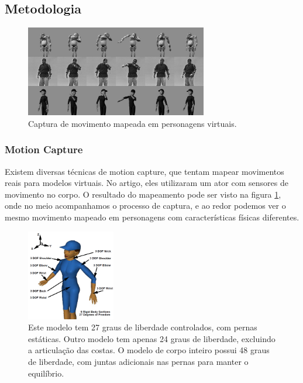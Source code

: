 \subsection{Metodologia}

\begin{figure}[ht]
  \centering
  \includegraphics[height=150px]{artigos/1999_Tracking_and_Modifying_Upper-body_Human_Motion_Data_with_Dynamic_Simulation_zordan_TMU/fig_mocap.png}
  \caption{Captura de movimento mapeada em personagens virtuais.}
  \label{fig:1999:upperbody:fig1}
\end{figure}


\subsubsection{Motion Capture}

Existem diversas técnicas de motion capture, que tentam mapear movimentos reais para modelos virtuais. No artigo, eles utilizaram um ator com sensores de movimento no corpo. O resultado do mapeamento pode ser visto na figura \ref{fig:1999:upperbody:fig1}, onde no meio acompanhamos o processo de captura, e ao redor podemos ver o mesmo movimento mapeado em personagens com características físicas diferentes.

\begin{figure}[ht]
  \centering
  \includegraphics[height=150px]{artigos/1999_Tracking_and_Modifying_Upper-body_Human_Motion_Data_with_Dynamic_Simulation_zordan_TMU/fig_model.png}
  \caption{Este modelo tem 27 graus de liberdade controlados, com pernas estáticas. Outro modelo tem apenas 24 graus de liberdade, excluindo a articulação das costas. O modelo de corpo inteiro possui 48 graus de liberdade, com juntas adicionais nas pernas para manter o equilíbrio.}
  \label{fig:1999:upperbody:fig2}
\end{figure}

